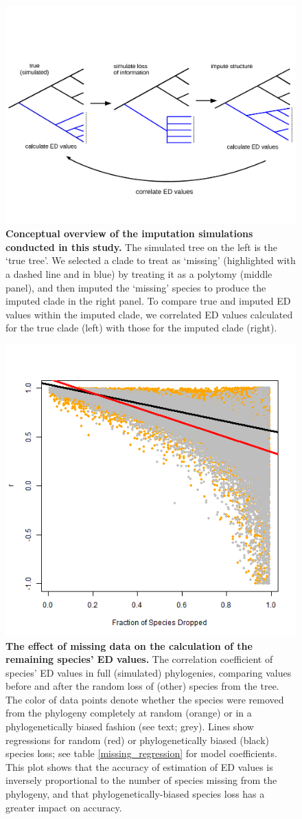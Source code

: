 \documentclass[10pt,english]{article}
\begin{document}
\begin{figure}[!ht]
  \center
  \includegraphics[width=.75\textwidth]{../figures/imputeConcept.png}
  \caption{\textbf{Conceptual overview of the imputation simulations conducted
  in this study.} The simulated tree on the left is the ‘true tree'. We selected
  a clade to treat as ‘missing' (highlighted with a dashed line and in blue) by
  treating it as a polytomy (middle panel), and then imputed the ‘missing'
  species to produce the imputed clade in the right panel. To compare true and
  imputed ED values within the imputed clade, we correlated ED values calculated
  for the true clade (left) with those for the imputed clade (right).}
  \label{imputeConcept}
\end{figure}

\begin{figure}[!ht]
  \center
  \includegraphics[width=.5\textwidth]{../figures/randomVsCluster.png}
  \caption{\textbf{The effect of missing data on the calculation of the
      remaining species' ED values.} The correlation coefficient of species' ED
      values in full (simulated) phylogenies, comparing values before and after
      the random loss of (other) species from the tree. The color of data points
      denote whether the species were removed from the phylogeny completely at
      random (orange) or in a phylogenetically biased fashion (see text; grey).
      Lines show regressions for random (red) or phylogenetically biased (black)
      species loss; see table \ref{missing_regression} for model coefficients.
      This plot shows that the accuracy of estimation of ED values is inversely
      proportional to the number of species missing from the phylogeny, and that
      phylogenetically-biased species loss has a greater impact on accuracy.}
  \label{randomVsClustered}
\end{figure}
\end{document}
